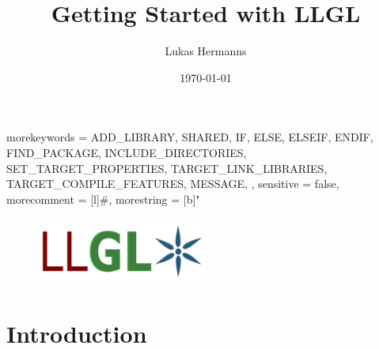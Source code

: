 \documentclass{article}
\title{Getting Started with LLGL}
\author{Lukas Hermanns}
\date{\today}
\begin{document}

\def\LLGL{\textcolor{darkBlueColor}{LLGL}\xspace}


{
	morekeywords = {
		ADD_LIBRARY,
		SHARED,
		IF,
		ELSE,
		ELSEIF,
		ENDIF,
		FIND_PACKAGE,
		INCLUDE_DIRECTORIES,
		SET_TARGET_PROPERTIES,
		TARGET_LINK_LIBRARIES,
		TARGET_COMPILE_FEATURES,
		MESSAGE,
	},
	sensitive = false,
	morecomment = [l]{\#},
	morestring = [b]"
}

\maketitle

\begin{figure}[ht]
	\centering
	\includegraphics[width=0.5\textwidth]{../LLGL_Logo.pdf}
\end{figure}

\newpage



\tableofcontents

\newpage



\part{Introduction}


\end{document}
